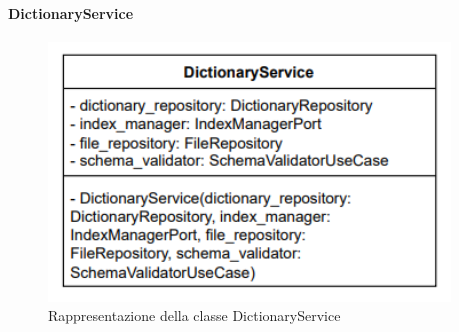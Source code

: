 \paragraph{DictionaryService} \label{DictionaryService}
\begin{figure}[H]
    \centering
    \includegraphics[width=0.95\textwidth]{assets/Backend/dictionary_service.png}
    \caption{Rappresentazione della classe DictionaryService}
  \end{figure}
